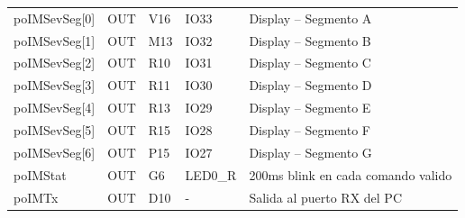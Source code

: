 \documentclass[12pt]{article}
\begin{document}
{\begin{tabular}{|p{2.5cm}|p{2.5cm}|p{1.3cm}|p{1.8cm}|p{7.5cm}|}
poIMSevSeg[0] &
OUT &
V16 &
IO33 &
Display – Segmento A
\\

poIMSevSeg[1] &
OUT &
M13 &
IO32 &
Display – Segmento B
\\

poIMSevSeg[2] &
OUT &
R10 &
IO31 &
Display – Segmento C
\\

poIMSevSeg[3] &
OUT &
R11 &
IO30 &
Display – Segmento D
\\

poIMSevSeg[4] &
OUT &
R13 &
IO29 &
Display – Segmento E
\\

poIMSevSeg[5] &
OUT &
R15 &
IO28 &
Display – Segmento F
\\

poIMSevSeg[6] &
OUT &
P15 &
IO27 &
Display – Segmento G
\\

poIMStat &
OUT &
G6 &
LED0\_R &
200ms blink en cada comando valido
\\

poIMTx &
OUT &
D10 &
- &
Salida al puerto RX del PC
\\

\hline
\end{tabular}}
\end{document}
